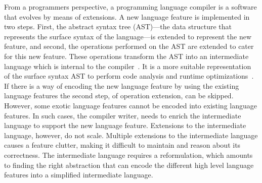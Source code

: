 \documentclass[screen,nonacm,manuscript,review]{acmart} %
\begin{document}
From a programmers perspective, a programming language compiler is
a software that evolves by means of extensions. A new language feature
is implemented in two steps. First, the abstract syntax tree (AST)---the
data structure that represents the surface syntax of the language---is
extended to represent the new feature, and second, the operations
performed on the AST are extended to cater for this new feature. These
operations transform the AST into an intermediate language which is internal to the
compiler~\cite{siek_compilation_2023}. It is a more suitable
representation of the surface syntax AST to perform code analysis and
runtime optimizations~\cite{aho_compilers_1986}.
If there is a way of encoding the new language feature by using the
existing language features the second step, of operation extension, can be
skipped. However, some exotic language features cannot be encoded
into existing language features. In such cases, the compiler writer, needs
to enrich the intermediate language to support the
new language feature. Extensions to the intermediate language,
however, do not scale. Multiple extensions to the intermediate
language causes a feature clutter, making it difficult to
maintain and reason about its correctness. The intermediate language
requires a reformulation, which amounts to finding the right
abstraction that can encode the different high level language features
into a simplified intermediate language.
\end{document}
